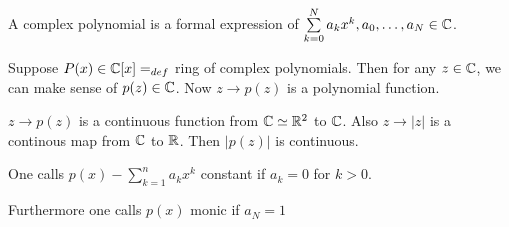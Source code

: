 
\begin{term}
A complex polynomial is a formal expression of $\sum\limits_{k=0}^N a_kx^k, a_0, \ldots, a_N \in \mathbb{C}$.
\end{term}
Suppose $P(x)\in \mathbb{C}[x] =_{def}$ ring of complex polynomials. Then for any $z\in \mathbb{C}$, we can make sense of $p(z)\in \mathbb{C}$. Now $z\to p(z)$ is a polynomial function.
\begin{obs}
$z\to p(z)$ is a continuous function from $\mathbb{C}\simeq \mathbb{R}^2$ to $\mathbb{C}$. Also $z\to |z|$ is a continous map from $\mathbb{C}$ to $\mathbb{R}$. Then $|p(z)|$ is continuous.
\end{obs}
\begin{term}
One calls $p(x)-\sum_{k=1}^n a_k x^k$ constant if $a_k=0$ for $k>0$. \par Furthermore one calls $p(x)$ monic if $a_N=1$
\end{term}
